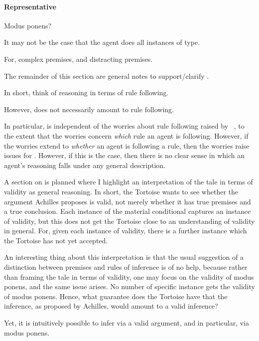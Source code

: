 \paragraph{Representative}

\begin{note}
  Modus ponens?

  It may not be the case that the agent does all instances of type.

  For, complex premises, and distracting premises.
\end{note}

{
  \color{red}

  The remainder of this section are general notes to support/clarify \sR{}.

  In short, think of reasoning in terms of rule following.

  However, \sR{} does not necessarily amount to rule following.

  In particular, \sR{} is independent of the worries about rule following raised by ~\textcite{Kripke:1982aa}, to the extent that the worries concern \emph{which} rule an agent is following.
  However, if the worries extend to \emph{whether} an agent is following a rule, then the worries raise issues for \sR{}.
  However, if this is the case, then there is no clear sense in which an agent's reasoning falls under any general description.

  A section on \textcite{Carroll:1895uj} is planned where I highlight an interpretation of the tale in terms of validity as general reasoning.
  In short, the Tortoise wants to see whether the argument Achilles proposes is valid, not merely whether it has true premises and a true conclusion.
  Each instance of the material conditional captures an instance of validity, but this does not get the Tortoise close to an understanding of validity in general.
  For, given each instance of validity, there is a further instance which the Tortoise has not yet accepted.

  An interesting thing about this interpretation is that the usual suggestion of a distinction between premises and rules of inference is of no help, because rather than framing the tale in terms of validity, one may focus on the validity of modus ponens, and the same issue arises.
  No number of specific instance gets the validity of modus ponens.
  Hence, what guarantee does the Tortoise have that the inference, as proposed by Achilles, would amount to a valid inference?

  Yet, it is intuitively possible to infer via a valid argument, and in particular, via modus ponens.
}

